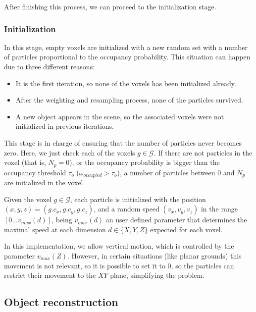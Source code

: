 After finishing this process, we can proceed to the initialization stage.

\subsubsection{Initialization}\label{ch:chapter05_01_04_03}

In this stage, empty voxels are initialized with a new random set with a number of particles proportional to the occupancy probability. This situation can happen due to three different reasons:
\begin{itemize}
 \item It is the first iteration, so none of the voxels has been initialized already.
 \item After the weighting and resampling process, none of the particles survived.
 \item A new object appears in the scene, so the associated voxels were not initialized in previous iterations.
\end{itemize}

This stage is in charge of ensuring that the number of particles never becomes zero. Here, we just check each of the voxels $g \in \mathcal{G}$. If there are not particles in the voxel (that is, $N_p = 0$), or the occupancy probability is bigger than the occupancy threshold $\tau_{o}$ ($\omega_{occupied} > \tau_{o}$), a number of particles between 0 and $N_p$ are initialized in the voxel.

Given the voxel $g \in \mathcal{G}$, each particle is initialized with the position $(x, y, z) = (g.c_x, g.c_y, g.c_z)$, and a random speed $(v_x, v_y, v_z)$ in the range $[0\dots v_{max}(d)]$, being $v_{max}(d)$ an user defined parameter that determines the maximal speed at each dimension $d \in \{ X, Y, Z\}$ expected for each voxel. 

In this implementation, we allow vertical motion, which is controlled by the parameter $v_{max}(Z)$. However, in certain situations (like planar grounds) this movement is not relevant, so it is possible to set it to $0$, so the particles can restrict their movement to the $XY$ plane, simplifying the problem.

\FloatBarrier

\subsection{Object reconstruction}\label{ch:chapter05_01_05}

